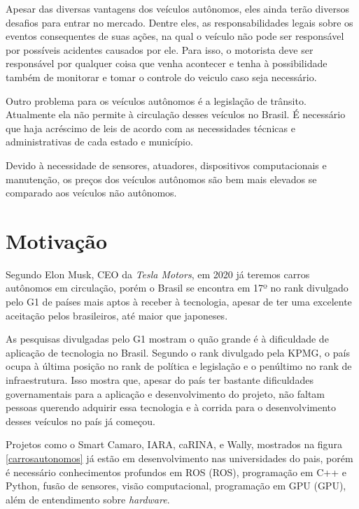 Apesar das diversas vantagens dos veículos autônomos, eles ainda terão diversos desafios para entrar no mercado. Dentre eles, as responsabilidades legais sobre os eventos consequentes de suas ações, na qual o veículo não pode ser responsável por possíveis acidentes causados por ele. Para isso, o motorista deve ser responsável por qualquer coisa que venha acontecer e tenha à possibilidade também de monitorar e tomar o controle do veiculo caso seja necessário. \cite{inproceedings}

Outro problema para os veículos autônomos é a legislação de trânsito. Atualmente ela não permite à circulação desses veículos no Brasil. É necessário que haja acréscimo de leis de acordo com as necessidades técnicas e administrativas de cada estado e município.\cite{inproceedings}

Devido à necessidade de sensores, atuadores, dispositivos computacionais e manutenção, os preços dos veículos autônomos são bem mais elevados se comparado aos veículos não autônomos. \cite{inproceedings}

\section{Motivação}
\label{sec:motivacao}

Segundo Elon Musk, CEO da \textit{Tesla Motors}, em 2020 já teremos carros autônomos em circulação\cite{elonmusk}, porém o Brasil se encontra em 17º no rank divulgado pelo G1\cite{brasilutimorank} de países mais aptos à receber à tecnologia, apesar de ter uma excelente aceitação pelos brasileiros, até maior que japoneses. 

As pesquisas divulgadas pelo G1 mostram o quão grande é à dificuldade de aplicação de tecnologia no Brasil. Segundo o rank divulgado pela KPMG, o país ocupa à última posição no rank de política e legislação e o penúltimo no rank de infraestrutura. Isso mostra que, apesar do país ter bastante dificuldades governamentais para a aplicação e desenvolvimento do projeto, não faltam pessoas querendo adquirir essa tecnologia e à corrida para o desenvolvimento desses veículos no país já começou. 

Projetos como o Smart Camaro, IARA, caRINA, e Wally, mostrados na figura \ref{carrosautonomos} \cite{carroautonomobrasil} já estão em desenvolvimento nas universidades do pais, porém é necessário conhecimentos profundos em ROS (\acrlong{ROS}), programação em C++ e Python, fusão de sensores, visão computacional, programação em GPU (\acrlong{GPU}), além de entendimento sobre \textit{hardware}.

